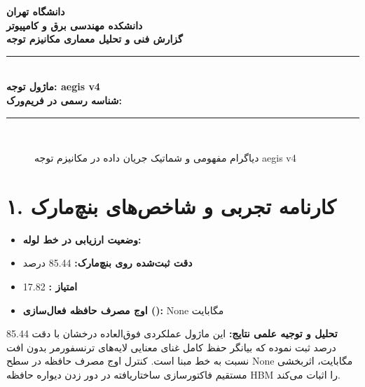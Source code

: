 \documentclass[12pt,a4paper]{article}
\begin{document}
\begin{center}
{\Large\bfseries دانشگاه تهران}\\[0.2cm]
{\large\bfseries دانشکده مهندسی برق و کامپیوتر}\\[0.2cm]
{\large\bfseries گزارش فنی و تحلیل معماری مکانیزم توجه}\\[0.5cm]
\rule{\linewidth}{1pt}\\[0.3cm]
{\LARGE\bfseries ماژول توجه: aegis v4}\\[0.2cm]
{\large \textbf{شناسه رسمی در فریم‌ورک:} }\\[0.2cm]
\rule{\linewidth}{1pt}\\[0.5cm]
\end{center}

\begin{figure}[H]
\centering
{}
\caption{دیاگرام مفهومی و شماتیک جریان داده در مکانیزم توجه aegis v4}
\end{figure}

\section*{۱. کارنامه تجربی و شاخص‌های بنچ‌مارک}
\begin{itemize}
\item \textbf{وضعیت ارزیابی در خط لوله:} 
\item \textbf{دقت ثبت‌شده روی بنچ‌مارک:} 85.44 درصد
\item \textbf{امتیاز :} 17.82
\item \textbf{اوج مصرف حافظه فعال‌سازی ():} None مگابایت
\end{itemize}
\textbf{تحلیل و توجیه علمی نتایج:} این ماژول عملکردی فوق‌العاده درخشان با دقت 85.44 درصد ثبت نموده که بیانگر حفظ کامل غنای معنایی لایه‌های ترنسفورمر بدون افت نسبت به خط مبنا است. کنترل اوج مصرف حافظه در سطح None مگابایت، اثربخشی مستقیم فاکتورسازی ساختاریافته در دور زدن دیواره حافظه HBM را اثبات می‌کند.
\end{document}
